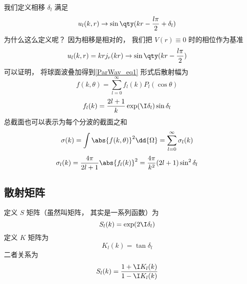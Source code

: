 我们定义相移 $\delta_l$ 满足
\begin{equation}
u_l(k, r) \to \sin\qty(kr - \frac{l\pi}{2} + \delta_l)
\end{equation}
为什么这么定义呢？ 因为相移是相对的， 我们把 $V(r) \equiv 0$ 时的相位作为基准
\begin{equation}
u_l(k, r) = kr j_r(kr) \to \sin\qty(kr - \frac{l\pi}{2})
\end{equation}
可以证明， 将球面波叠加得到\autoref{ParWav_eq1} 形式后散射幅为
\begin{equation}
f(k, \theta) = \sum_{l=0}^\infty f_l(k) P_l(\cos\theta)
\end{equation}
\begin{equation}
f_l(k) = \frac{2l+1}{k} \exp(\I\delta_l) \sin\delta_l
\end{equation}
总截面也可以表示为每个分波的截面之和
\begin{equation}
\sigma(k) = \int \abs{f(k,\theta)}^2 \dd{\Omega} = \sum_{l=0}^\infty \sigma_l(k)
\end{equation}
\begin{equation}
\sigma_l(k) = \frac{4\pi}{2l+1} \abs{f_l(k)}^2 = \frac{4\pi}{k^2} (2l + 1) \sin^2 \delta_l
\end{equation}

\subsection{散射矩阵}
定义 $S$ 矩阵（虽然叫矩阵， 其实是一系列函数）为
\begin{equation}
S_l(k) = \exp(2\I\delta_l)
\end{equation}
定义 $K$ 矩阵为
\begin{equation}
K_l(k) = \tan \delta_l
\end{equation}
二者关系为
\begin{equation}
S_l(k) = \frac{1 + \I K_l(k)}{1 - \I K_l(k)}
\end{equation}

